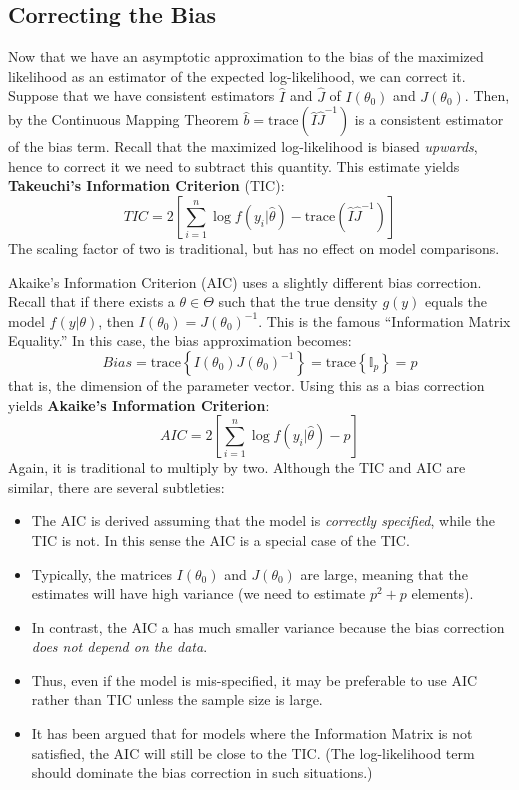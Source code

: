 \documentclass[12pt]{article}
\theoremstyle{definition}
\begin{document}
\subsection{Correcting the Bias}
Now that we have an asymptotic approximation to the bias of the maximized likelihood as an estimator of the expected log-likelihood, we can correct it. Suppose that we have consistent estimators $\hat{I}$ and $\hat{J}$ of $I(\theta_0)$ and $J(\theta_0)$. Then, by the Continuous Mapping Theorem $\hat{b}=\mbox{trace}(\hat{I}\hat{J}^{-1})$ is a consistent estimator of the bias term. Recall that the maximized log-likelihood is biased \emph{upwards}, hence to correct it we need to subtract this quantity. This estimate yields \textbf{Takeuchi's Information Criterion} (TIC):
	$$TIC = 2\left[ \sum_{i=1}^n \log{f\left( y_i | \hat{\theta} \right)} - \mbox{trace}(\hat{I}\hat{J}^{-1}) \right]$$
The scaling factor of two is traditional, but has no effect on model comparisons.

Akaike's Information Criterion (AIC) uses a slightly different bias correction. Recall that if there exists a $\theta \in \Theta$ such that the true density $g(y)$ equals the model $f(y|\theta)$, then $I(\theta_0)=J(\theta_0)^{-1}$. This is the famous ``Information Matrix Equality.'' In this case, the bias approximation becomes:
	$$Bias = \mbox{trace}\left\{ I(\theta_0)J(\theta_0)^{-1} \right\} = \mbox{trace}\left\{ \mathbb{I}_p \right\}=p$$
that is, the dimension of the parameter vector. Using this as a bias correction yields \textbf{Akaike's Information Criterion}:
	$$AIC = 2\left[ \sum_{i=1}^n \log{f\left( y_i | \hat{\theta} \right)} - p \right]$$
Again, it is traditional to multiply by two. Although the TIC and AIC are similar, there are several subtleties:
	\begin{itemize}
		\item The AIC is derived assuming that the model is \emph{correctly specified}, while the TIC is not. In this sense the AIC is a special case of the TIC.
		\item Typically, the matrices $I(\theta_0)$ and $J(\theta_0)$ are large, meaning that the estimates will have high variance (we need to estimate $p^2 + p$ elements).
		\item In contrast, the AIC a has much smaller variance because the bias correction \emph{does not depend on the data}. 
		\item Thus, even if the model is mis-specified, it may be preferable to use AIC rather than TIC unless the sample size is large.
		\item It has been argued that for models where the Information Matrix is not satisfied, the AIC will still be close to the TIC. (The log-likelihood term should dominate the bias correction in such situations.)
	\end{itemize}
\end{document}
